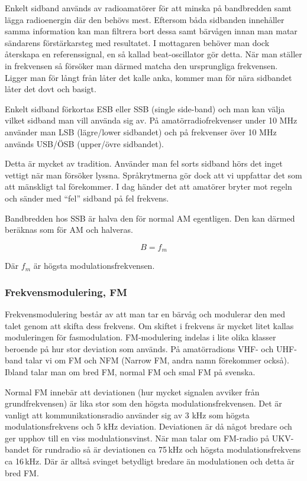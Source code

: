 Enkelt sidband används av radioamatörer för att minska på bandbredden samt
lägga radioenergin där den behövs mest. Eftersom båda sidbanden innehåller
samma information kan man filtrera bort dessa samt bärvågen innan man matar
sändarens förstärkarsteg med resultatet. I mottagaren behöver man dock
återskapa en referenssignal, en så kallad beat-oscillator gör detta. När man
ställer in frekvensen så försöker man därmed matcha den ursprungliga
frekvensen. Ligger man för långt från låter det kalle anka, kommer man för
nära sidbandet låter det dovt och basigt.

Enkelt sidband förkortas ESB eller SSB (single side-band) och man kan välja
vilket sidband man vill använda sig av. På amatörradiofrekvenser under 10 MHz
använder man LSB (lägre/lower sidbandet) och på frekvenser över 10 MHz används
USB/ÖSB (upper/övre sidbandet).

Detta är mycket av tradition. Använder man fel sorts sidband hörs det inget
vettigt när man försöker lyssna. Språkrytmerna gör dock att vi uppfattar det
som att mänskligt tal förekommer. I dag händer det att amatörer bryter mot
regeln och sänder med ``fel'' sidband på fel frekvens.

Bandbredden hos SSB är halva den för normal AM egentligen. Den kan därmed
beräknas som för AM och halveras.

$$B=f_m$$

Där $f_m$ är högsta modulationsfrekvensen.

\subsubsection{Frekvensmodulering, FM}

Frekvensmodulering består av att man tar en bärvåg och modulerar den med talet
genom att skifta dess frekvens. Om skiftet i frekvens är mycket litet kallas
moduleringen för fasmodulation. FM-modulering indelas i lite olika klasser
beroende på hur stor deviation som används. På amatörradions VHF- och UHF-band
talar vi om FM och NFM (Narrow FM, andra namn förekommer också). Ibland talar
man om bred FM, normal FM och smal FM på svenska.

Normal FM innebär att deviationen (hur mycket signalen avviker från grundfrekvensen) är lika stor som den högsta modulationsfrekvensen. Det är vanligt att kommunikationsradio använder sig av 3 kHz som högsta modulationsfrekvens och 5 kHz deviation. Deviationen är då något bredare och ger upphov till en viss modulationsvinst. När man talar om FM-radio på UKV-bandet för rundradio så är deviationen ca 75\,kHz och högsta modulationsfrekvens ca 16\,kHz. Där är alltså svinget betydligt bredare än modulationen och detta är bred FM.

